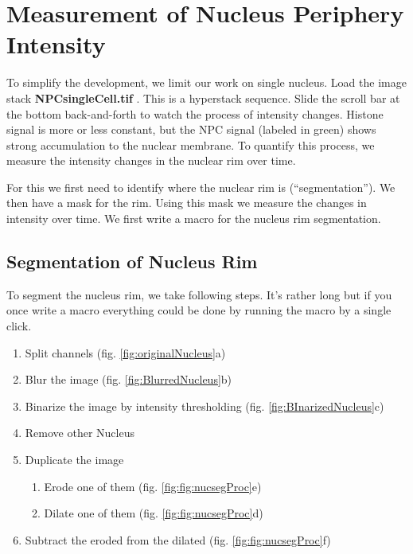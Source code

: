\section{Measurement of Nucleus Periphery Intensity}

To simplify the development, we limit our work on single nucleus. Load the image stack \textbf{NPCsingleCell.tif} . This is a hyperstack sequence. Slide the scroll bar at the bottom back-and-forth to watch the process of intensity changes. Histone signal is more or less constant, but the NPC signal (labeled in green) shows strong accumulation to the nuclear membrane. To quantify this process, we measure the intensity changes in the nuclear rim over time.

For this we first need to identify where the nuclear rim is (``segmentation''). We then have a mask for the rim. Using this mask we measure the changes in intensity over time. We first write a macro for the nucleus rim segmentation.

\subsection{Segmentation of Nucleus Rim}

To segment the nucleus rim, we take following steps. It's rather long but if you once write a macro everything could be done by running the macro by a single click.

\begin{enumerate}
  \item Split channels (fig. \ref{fig:originalNucleus}a)
  \item Blur the image (fig. \ref{fig:BlurredNucleus}b)
  \item Binarize the image by intensity thresholding (fig. \ref{fig:BInarizedNucleus}c)
  \item Remove other Nucleus
  \item Duplicate the image
  \begin{enumerate}
    \item Erode one of them (fig. \ref{fig:fig:nucsegProc}e)
    \item Dilate one of them (fig. \ref{fig:fig:nucsegProc}d)
  \end{enumerate}
  \item Subtract the eroded from the dilated (fig. \ref{fig:fig:nucsegProc}f)
\end{enumerate}